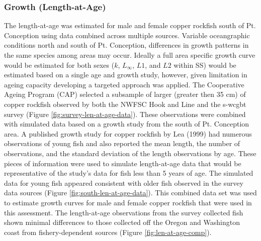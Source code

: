 \documentclass[11pt,
  english,
  a4paper,
]{article}
\begin{document}
\leavevmode\tagmcend\tagstructend\par


\hypertarget{growth-length-at-age}{%
\subsubsection{Growth (Length-at-Age)}\label{growth-length-at-age}}

\leavevmode\tagmcend\tagstructend


The length-at-age was estimated for male and female copper rockfish south of Pt. Conception using data combined across multiple sources. Variable oceangraphic conditions north and south of Pt. Conception, differences in growth patterns in the same species among areas may occur. Ideally a full area specific growth curve would be estimated for both sexes ({\(k\)\leavevmode\tagmcend\tagstructend}, {\(L_{\infty}\)\leavevmode\tagmcend\tagstructend}, {\(L1\)\leavevmode\tagmcend\tagstructend}, and {\(L2\)\leavevmode\tagmcend\tagstructend} within SS) would be estimated based on a single age and growth study, however, given limitation in ageing capacity developing a targeted approach was applied. The Cooperative Ageing Program (CAP) selected a subsample of larger (greater then 35 cm) of copper rockfish observed by both the NWFSC Hook and Line and the \Gls{s-wcgbt} survey (Figure \ref{fig:survey-len-at-age-data}). These observations were combined with simulated data based on a growth study from the south of Pt. Conception area. A published growth study for copper rockfish by Lea {(1999)\leavevmode\tagmcend\tagstructend} had numerous observations of young fish and also reported the mean length, the number of observations, and the standard deviation of the length observations by age. These pieces of information were used to simulate length-at-age data that would be representative of the study's data for fish less than 5 years of age. The simulated data for young fish appeared consistent with older fish observed in the survey data sources (Figure \ref{fig:south-len-at-age-data}). This combined data set was used to estimate growth curves for male and female copper rockfish that were used in this assessment. The length-at-age observations from the survey collected fish shown minimal differences to those collected off the Oregon and Washington coast from fishery-dependent sources (Figure \ref{fig:len-at-age-comp}).
\end{document}
